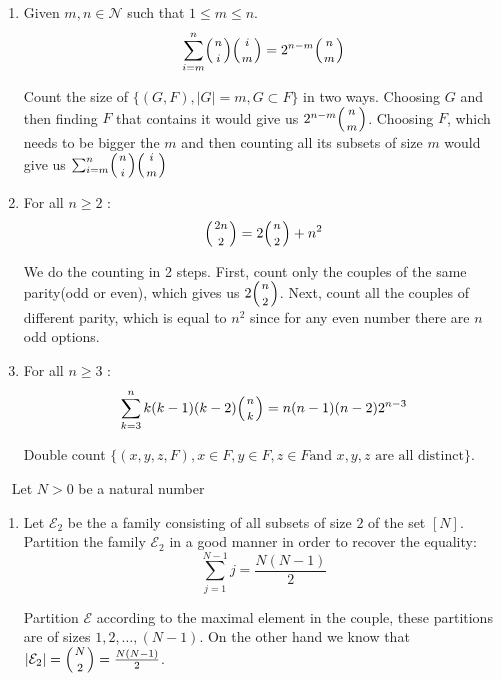 \documentclass[a4paper,11pt]{exam}
\renewcommand{\binom}{\mbinom}
\newcommand{\N}{\mathcal N}
\begin{document}
\begin{questions}
\begin{enumerate}
\begin{solution}
			\end{solution}
			
			\item Given $m,n\in \N$ such that $1 \leq m \leq n$.
			\[
			\sum_{i=m}^n \binom{n}{i}\binom{i}{m} = 2^{n-m}\binom{n}{m}
			\]
			
			\begin{solution}
				Count the size of $\{ (G,F), |G| = m, G \subset F \}$ in two ways. Choosing $ G $ and then finding $F$ that contains it would give us $ 2^{n-m}\binom{n}{m} $. Choosing $ F $, which needs to be bigger the $m$ and then counting all its  subsets of size $m$ would give us $\sum_{i=m}^n \binom{n}{i}\binom{i}{m}$
				
			\end{solution}
			
			\item For all $n \geq 2$ :
			\[
			\binom{2n}{2} = 2\binom{n}{2} + n^2
			\]
			
			\begin{solution}
				We do the counting in 2 steps. First, count only the couples of the same parity(odd or even), which gives us $ 2\binom{n}{2} $.  Next, count all the couples of different parity, which is equal to $n^2$ since for any even number there are $n$ odd options.
			\end{solution}
			
			\item For all $n \geq 3$ :
			\[
			\sum_{k=3}^n k(k-1)(k-2)\binom{n}{k} = n(n-1)(n-2)2^{n-3}
			\]
			
			\begin{solution}
				Double count $\{(x, y, z, F ), x \in F, y \in F, z \in F \text{
					and } x, y, z \text{ are all distinct} \}$.
			\end{solution}
		\end{enumerate}
		
		\question ~
		Let $N>0$ be a natural number
		\begin{enumerate}
			\item Let $\mathcal{E}_2$ be the a family consisting  of all subsets of size $2$ of the set	$[N]$.
			Partition the family $\mathcal{E}_2$ in a good manner in order to recover the equality:
			\[
			\sum_{j=1}^{N-1}j = \frac{N(N-1)}{2}
			\]
			
			\begin{solution}
				
				Partition $\mathcal{E}$ according to the maximal element in the couple, these partitions are of sizes $1,2,\ldots,(N-1)$. On the other hand we know that $|\mathcal{E}_2| = \binom{N}{2} =
				\frac{N(N-1)}{2}$.
			\end{solution}
			

\end{enumerate}
\end{questions}
\end{document}
